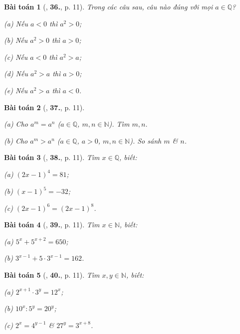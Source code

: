 \documentclass{article}
\numberwithin{equation}{section}
\newtheorem{baitoan}{Bài toán}[section]
\begin{document}
\begin{baitoan}[\cite{Binh_Toan_7_tap_1}, \textbf{36.}, p. 11]
	Trong các câu sau, câu nào đúng với mọi $a\in\mathbb{Q}$?
	\begin{enumerate*}
		\item[(a)] Nếu $a < 0$ thì $a^2 > 0$;
		\item[(b)] Nếu $a^2 > 0$ thì $a > 0$;
		\item[(c)] Nếu $a < 0$ thì $a^2 > a$;
		\item[(d)] Nếu $a^2 > a$ thì $a > 0$;
		\item[(e)] Nếu $a^2 > a$ thì $a < 0$.
	\end{enumerate*}
\end{baitoan}

\begin{baitoan}[\cite{Binh_Toan_7_tap_1}, \textbf{37.}, p. 11]
	\begin{enumerate*}
		\item[(a)] Cho $a^m = a^n$ ($a\in\mathbb{Q}$, $m,n\in\mathbb{N}$). Tìm $m,n$.
		\item[(b)] Cho $a^m > a^n$ ($a\in\mathbb{Q}$, $a > 0$, $m,n\in\mathbb{N}$). So sánh $m$ \& $n$.
	\end{enumerate*}
\end{baitoan}

\begin{baitoan}[\cite{Binh_Toan_7_tap_1}, \textbf{38.}, p. 11]
	Tìm $x\in\mathbb{Q}$, biết:
	\begin{enumerate*}
		\item[(a)] $(2x - 1)^4 = 81$;
		\item[(b)] $(x - 1)^5 = -32$;
		\item[(c)] $(2x - 1)^6 = (2x - 1)^8$.
	\end{enumerate*}
\end{baitoan}

\begin{baitoan}[\cite{Binh_Toan_7_tap_1}, \textbf{39.}, p. 11]
	Tìm $x\in\mathbb{N}$, biết:
	\begin{enumerate*}
		\item[(a)] $5^x + 5^{x+2} = 650$;
		\item[(b)] $3^{x-1} + 5\cdot 3^{x-1} = 162$.
	\end{enumerate*}
\end{baitoan}

\begin{baitoan}[\cite{Binh_Toan_7_tap_1}, \textbf{40.}, p. 11]
	Tìm $x,y\in\mathbb{N}$, biết:
	\begin{enumerate*}
		\item[(a)] $2^{x+1}\cdot 3^y = 12^x$;
		\item[(b)] $10^x:5^y = 20^y$;
		\item[(c)] $2^x = 4^{y-1}$ \& $27^y = 3^{x+8}$.
	\end{enumerate*}
\end{baitoan}
\end{document}
